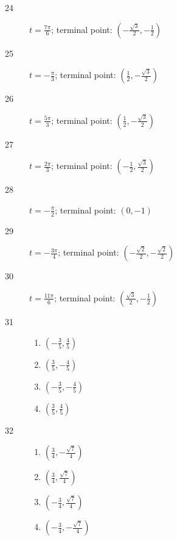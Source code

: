 \documentclass{exam}
\begin{document}
\begin{description}
      \item[24] $t = \frac{7 \pi}{6}$; terminal point: $\boxed{ \left( - \frac{\sqrt{3}}{2}, - \frac{1}{2} \right) }$

      \item[25] $t = -\frac{\pi}{3}$; terminal point: $\boxed{ \left( \frac{1}{2}, - \frac{\sqrt{3}}{2}  \right) }$

      \item[26] $t = \frac{5 \pi}{3}$; terminal point: $\boxed{ \left( \frac{1}{2}, - \frac{\sqrt{3}}{2}  \right) }$

      \item[27] $t = \frac{2 \pi}{3}$; terminal point: $\boxed{ \left( - \frac{1}{2}, \frac{\sqrt{3}}{2}  \right) }$

      \item[28] $t = -\frac{\pi}{2}$; terminal point: $\boxed{ \left( 0, -1 \right) }$

      \item[29] $t = - \frac{3 \pi}{4}$; terminal point: $\boxed{ \left( - \frac{\sqrt{2}}{2}, - \frac{\sqrt{2}}{2}  \right) }$
        
      \item[30] $t = \frac{11 \pi}{6}$; terminal point: $\boxed{ \left( \frac{\sqrt{3}}{2}, - \frac{1}{2}  \right) }$

      \item[31]
        \begin{enumerate}[a]
          \item $\left( - \frac{3}{5}, \frac{4}{5} \right)$
          \item $\left( \frac{3}{5}, - \frac{4}{5} \right)$
          \item $\left( - \frac{3}{5}, - \frac{4}{5} \right)$
          \item $\left( \frac{3}{5}, \frac{4}{5} \right)$
        \end{enumerate}

      \item[32]
        \begin{enumerate}[a]
          \item $\left( \frac{3}{4}, - \frac{\sqrt{7}}{4} \right)$
          \item $\left( \frac{3}{4}, \frac{\sqrt{7}}{4} \right)$
          \item $\left( - \frac{3}{4}, \frac{\sqrt{7}}{4} \right)$
          \item $\left( - \frac{3}{4}, - \frac{\sqrt{7}}{4} \right)$
        \end{enumerate}


\end{description}
\end{document}
